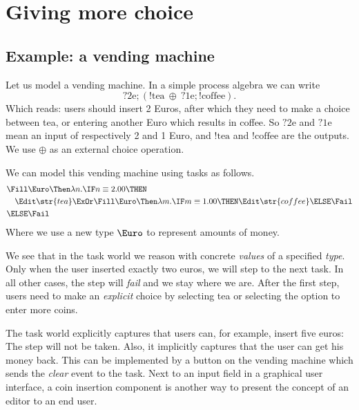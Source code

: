 
\section{Giving more choice}

\subsection{Example: a vending machine}

Let us model a vending machine.
In a simple process algebra we can write
\begin{equation*}
  ?\text{2e}; (!\text{tea}\ \oplus\ ?\text{1e}; !\text{coffee}).
\end{equation*}
Which reads:
users should insert 2 Euros,
after which they need to make a choice between tea,
or entering another Euro which results in coffee.
So $?\text{2e}$ and $?\text{1e}$ mean an input of respectively 2 and 1 Euro,
and $!\text{tea}$ and $!\text{coffee}$ are the outputs.
We use $\oplus$ as an external choice operation.

We can model this vending machine using tasks as follows.
\begin{align*}
  & \Fill \Euro \Then \lambda n.
  \IF n \equiv 2.00 \THEN \\
  &   \quad \Edit \str{tea}
    \ExOr
      \Fill \Euro \Then \lambda m.
      \IF m \equiv 1.00 \THEN
        \Edit \str{coffee}
      \ELSE
        \Fail \\
  & \ELSE \Fail
\end{align*}
Where we use a new type $\Euro$ to represent amounts of money.

We see that in the task world we reason with concrete \emph{values} of a specified \emph{type}.
Only when the user inserted exactly two euros,
we will step to the next task.
In all other cases,
the step will \emph{fail} and we stay where we are.
After the first step,
users need to make an \emph{explicit} choice by selecting tea or selecting the option to enter more coins.

The task world explicitly captures that users can, for example, insert five euros:
The step will not be taken.
Also, it implicitly captures that the user can get his money back.
This can be implemented by a button on the vending machine which sends the \emph{clear} event to the task.
Next to an input field in a graphical user interface,
a coin insertion component is another way to present the concept of an editor to an end user.


